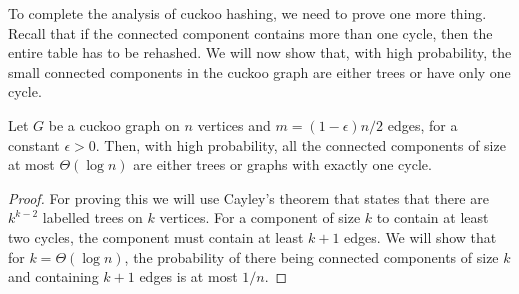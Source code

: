To complete the analysis of cuckoo hashing, we need to prove one more
thing. Recall that if the connected component contains more than one cycle, then
the entire table has to be rehashed. We will now show that, with high
probability, the small connected components in the cuckoo graph are either trees
or have only one cycle.

\begin{theorem}
  Let $G$ be a cuckoo graph on $n$ vertices and $m=(1-\epsilon)n/2$ edges, for a
  constant $\epsilon > 0$. Then, with high probability, all the
  connected components of size at most $\Theta(\log n)$ are either trees or
  graphs with exactly one cycle.
  \label{thm:cuckoo-graph-unicycle}
\end{theorem}
\begin{proof}
  For proving this we will use Cayley's theorem that states that there are
  $k^{k-2}$ labelled trees on $k$ vertices. For a component of size $k$ to
  contain at least two cycles, the component must contain at least $k+1$
  edges. We will show that for $k = \Theta(\log n)$, the probability of there
  being connected components of size $k$ and containing $k+1$ edges is at most
  $1/n$.


\end{proof}
